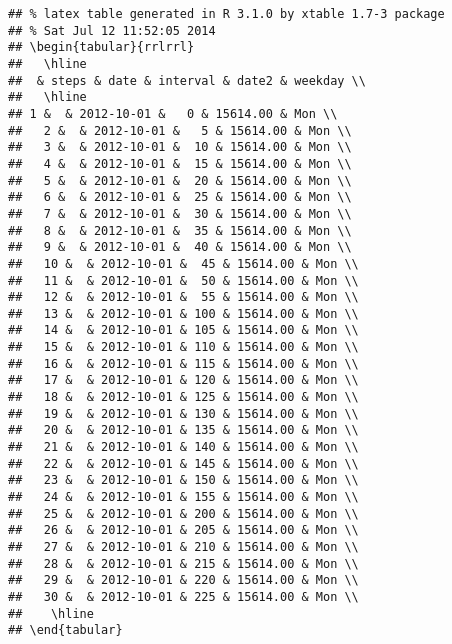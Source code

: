 \documentclass[]{article}
\begin{document}
\begin{verbatim}
## % latex table generated in R 3.1.0 by xtable 1.7-3 package
## % Sat Jul 12 11:52:05 2014
## \begin{tabular}{rrlrrl}
##   \hline
##  & steps & date & interval & date2 & weekday \\ 
##   \hline
## 1 &  & 2012-10-01 &   0 & 15614.00 & Mon \\ 
##   2 &  & 2012-10-01 &   5 & 15614.00 & Mon \\ 
##   3 &  & 2012-10-01 &  10 & 15614.00 & Mon \\ 
##   4 &  & 2012-10-01 &  15 & 15614.00 & Mon \\ 
##   5 &  & 2012-10-01 &  20 & 15614.00 & Mon \\ 
##   6 &  & 2012-10-01 &  25 & 15614.00 & Mon \\ 
##   7 &  & 2012-10-01 &  30 & 15614.00 & Mon \\ 
##   8 &  & 2012-10-01 &  35 & 15614.00 & Mon \\ 
##   9 &  & 2012-10-01 &  40 & 15614.00 & Mon \\ 
##   10 &  & 2012-10-01 &  45 & 15614.00 & Mon \\ 
##   11 &  & 2012-10-01 &  50 & 15614.00 & Mon \\ 
##   12 &  & 2012-10-01 &  55 & 15614.00 & Mon \\ 
##   13 &  & 2012-10-01 & 100 & 15614.00 & Mon \\ 
##   14 &  & 2012-10-01 & 105 & 15614.00 & Mon \\ 
##   15 &  & 2012-10-01 & 110 & 15614.00 & Mon \\ 
##   16 &  & 2012-10-01 & 115 & 15614.00 & Mon \\ 
##   17 &  & 2012-10-01 & 120 & 15614.00 & Mon \\ 
##   18 &  & 2012-10-01 & 125 & 15614.00 & Mon \\ 
##   19 &  & 2012-10-01 & 130 & 15614.00 & Mon \\ 
##   20 &  & 2012-10-01 & 135 & 15614.00 & Mon \\ 
##   21 &  & 2012-10-01 & 140 & 15614.00 & Mon \\ 
##   22 &  & 2012-10-01 & 145 & 15614.00 & Mon \\ 
##   23 &  & 2012-10-01 & 150 & 15614.00 & Mon \\ 
##   24 &  & 2012-10-01 & 155 & 15614.00 & Mon \\ 
##   25 &  & 2012-10-01 & 200 & 15614.00 & Mon \\ 
##   26 &  & 2012-10-01 & 205 & 15614.00 & Mon \\ 
##   27 &  & 2012-10-01 & 210 & 15614.00 & Mon \\ 
##   28 &  & 2012-10-01 & 215 & 15614.00 & Mon \\ 
##   29 &  & 2012-10-01 & 220 & 15614.00 & Mon \\ 
##   30 &  & 2012-10-01 & 225 & 15614.00 & Mon \\ 
##    \hline
## \end{tabular}
\end{verbatim}
\end{document}
